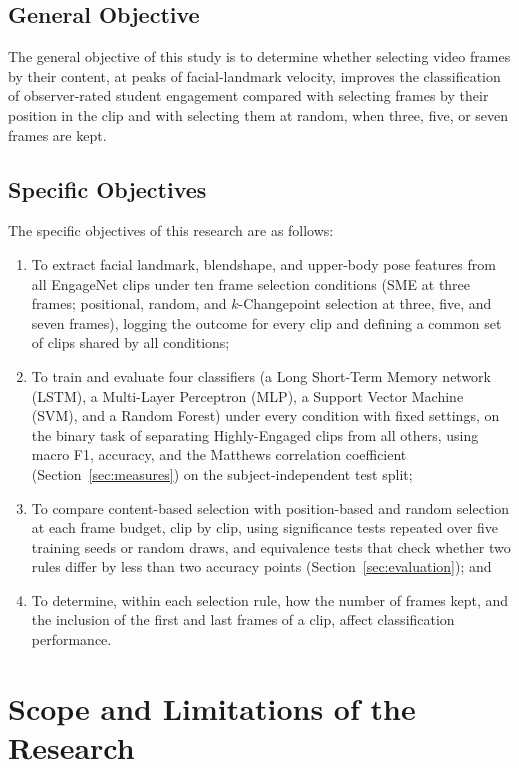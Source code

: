 \subsection{General Objective}

The general objective of this study is to determine whether selecting video frames by their content, at peaks of facial-landmark velocity, improves the classification of observer-rated student engagement compared with selecting frames by their position in the clip and with selecting them at random, when three, five, or seven frames are kept.

\subsection{Specific Objectives}

The specific objectives of this research are as follows:
\begin{enumerate}
   \item To extract facial landmark, blendshape, and upper-body pose features from all EngageNet clips under ten frame selection conditions (SME at three frames; positional, random, and $k$-Changepoint selection at three, five, and seven frames), logging the outcome for every clip and defining a common set of clips shared by all conditions;
   \item To train and evaluate four classifiers (a Long Short-Term Memory network (LSTM), a Multi-Layer Perceptron (MLP), a Support Vector Machine (SVM), and a Random Forest) under every condition with fixed settings, on the binary task of separating Highly-Engaged clips from all others, using macro F1, accuracy, and the Matthews correlation coefficient (Section~\ref{sec:measures}) on the subject-independent test split;
   \item To compare content-based selection with position-based and random selection at each frame budget, clip by clip, using significance tests repeated over five training seeds or random draws, and equivalence tests that check whether two rules differ by less than two accuracy points (Section~\ref{sec:evaluation}); and
   \item To determine, within each selection rule, how the number of frames kept, and the inclusion of the first and last frames of a clip, affect classification performance.
\end{enumerate}



\section{Scope and Limitations of the Research}
\label{sec:scopelimitations}

